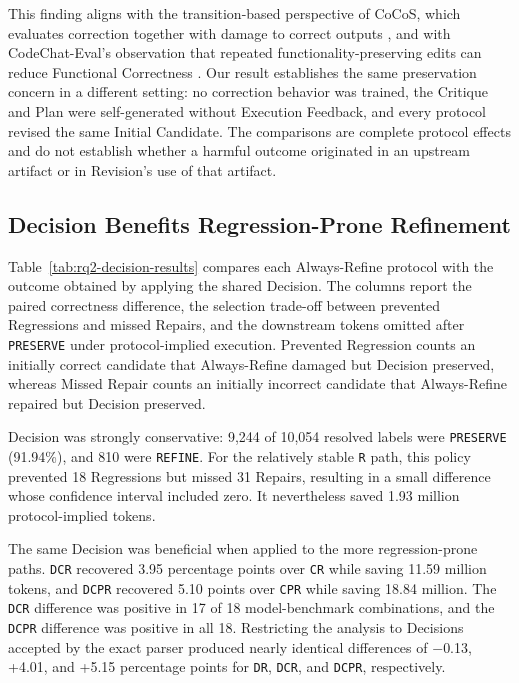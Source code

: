 This finding aligns with the transition-based perspective of CoCoS, which evaluates correction together with damage to correct outputs \cite{cho-etal-2025-self}, and with CodeChat-Eval's observation that repeated functionality-preserving edits can reduce Functional Correctness \cite{guo2026codechateval}.
Our result establishes the same preservation concern in a different setting: no correction behavior was trained, the Critique and Plan were self-generated without Execution Feedback, and every protocol revised the same Initial Candidate.
The comparisons are complete protocol effects and do not establish whether a harmful outcome originated in an upstream artifact or in Revision's use of that artifact.

\subsection{Decision Benefits Regression-Prone Refinement}

Table~\ref{tab:rq2-decision-results} compares each Always-Refine protocol with the outcome obtained by applying the shared Decision.
The columns report the paired correctness difference, the selection trade-off between prevented Regressions and missed Repairs, and the downstream tokens omitted after \texttt{PRESERVE} under protocol-implied execution.
Prevented Regression counts an initially correct candidate that Always-Refine damaged but Decision preserved, whereas Missed Repair counts an initially incorrect candidate that Always-Refine repaired but Decision preserved.



Decision was strongly conservative: 9,244 of 10,054 resolved labels were \texttt{PRESERVE} (91.94\%), and 810 were \texttt{REFINE}.
For the relatively stable \texttt{R} path, this policy prevented 18 Regressions but missed 31 Repairs, resulting in a small difference whose confidence interval included zero.
It nevertheless saved 1.93 million protocol-implied tokens.

The same Decision was beneficial when applied to the more regression-prone paths.
\texttt{DCR} recovered 3.95 percentage points over \texttt{CR} while saving 11.59 million tokens, and \texttt{DCPR} recovered 5.10 points over \texttt{CPR} while saving 18.84 million.
The \texttt{DCR} difference was positive in 17 of 18 model-benchmark combinations, and the \texttt{DCPR} difference was positive in all 18.
Restricting the analysis to Decisions accepted by the exact parser produced nearly identical differences of $-$0.13, +4.01, and +5.15 percentage points for \texttt{DR}, \texttt{DCR}, and \texttt{DCPR}, respectively.

